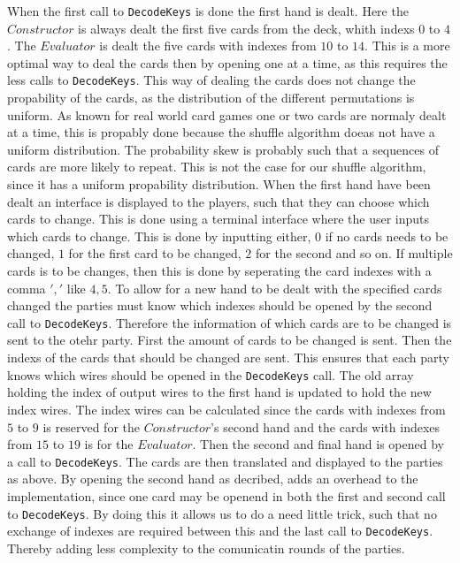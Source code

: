 \documentclass[twoside,11pt,openright]{report}
\begin{document}
When the first call to \verb|DecodeKeys| is done the first hand is dealt. Here the $Constructor$ is always dealt the first five cards from the deck, whith indexs $0$ to $4$. The $Evaluator$ is dealt the five cards with indexes from $10$ to $14$. This is a more optimal way to deal the cards then by opening one at a time, as this requires the less calls to \verb|DecodeKeys|. This way of dealing the cards does not change the propability of the cards, as the distribution of the different permutations is uniform. As known for real world card games one or two cards are normaly dealt at a time, this is propably done because the shuffle algorithm doeas not have a uniform distribution. The probability skew is probably such that a sequences of cards are more likely to repeat. This is not the case for our shuffle algorithm, since it has a uniform propability distribution. When the first hand have been dealt an interface is displayed to the players, such that they can choose which cards to change. This is done using a terminal interface where the user inputs which cards to change. This is done by inputting either, $0$ if no cards needs to be changed, $1$ for the first card to be changed, $2$ for the second and so on. If multiple cards is to be changes, then this is done by seperating the card indexes with a comma $','$ like $4,5$. To allow for a new hand to be dealt with the specified cards changed the parties must know which indexes should be opened by the second call to \verb|DecodeKeys|. Therefore the information of which cards are to be changed is sent to the otehr party. First the amount of cards to be changed is sent. Then the indexs of the cards that should be changed are sent. This ensures that each party knows which wires should be opened in the \verb|DecodeKeys| call. The old array holding the index of output wires to the first hand is updated to hold the new index wires. The index wires can be calculated since the cards with indexes from $5$ to $9$ is reserved for the $Constructor$'s second hand and the cards with indexes from $15$ to $19$ is for the $Evaluator$. Then the second and final hand is opened by a call to \verb|DecodeKeys|. The cards are then translated and displayed to the parties as above. By opening the second hand as decribed, adds an overhead to the implementation, since one card may be openend in both the first and second call to \verb|DecodeKeys|. By doing this it allows us to do a need little trick, such that no exchange of indexes are required between this and the last call to \verb|DecodeKeys|. Thereby adding less complexity to the comunicatin rounds of the parties.
\end{document}
